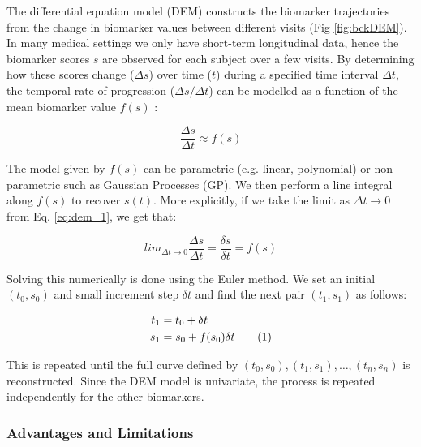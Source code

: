 The differential equation model (DEM) \cite{ashford2001modeling, yang2011quantifying, sabuncu2011dynamics, villemagne2013amyloid, oxtoby2018} constructs the biomarker trajectories from the change in biomarker values between different visits (Fig \ref{fig:bckDEM}). In many medical settings we only have short-term longitudinal data, hence the biomarker scores $s$ are observed for each subject over a few visits. By determining how these scores change ($\Delta s$) over time ($t$) during a specified time interval $\Delta t$, the temporal rate of progression ($\Delta s/\Delta t$) can be modelled as a function of the mean biomarker value $f(s)$ \cite{ashford2001modeling}:

\begin{equation}
\label{eq:dem_1}
 \frac{\Delta s}{\Delta t} \approx f(s)
\end{equation}

The model given by $f(s)$ can be parametric (e.g. linear, polynomial) or non-parametric such as Gaussian Processes (GP). We then perform a line integral along $f(s)$ to recover $s(t)$. More explicitly, if we take the limit as $\Delta t \xrightarrow{} 0$ from Eq. \ref{eq:dem_1}, we get that:

\begin{equation}
\label{eq:dem2}
lim_{\Delta t \xrightarrow{}  0} \frac{\Delta s}{\Delta t} = \frac{\delta s}{\delta t} = f(s)
\end{equation}

Solving this numerically is done using the Euler method. We set an initial $(t_0,s_0)$ and small increment step $\delta t$ and find the next pair $(t_1, s_1)$ as follows:

\newcommand\numberthis{\addtocounter{equation}{1}\tag{\theequation}}

\begin{align*}
 t_1 &= t_0 + \delta t \\
 s_1 &= s_0 + f(s_0) \delta t \numberthis \label{eq:dem3}
\end{align*}

This is repeated until the full curve defined by $(t_0, s_0), (t_1, s_1), \dots, (t_n, s_n)$ is reconstructed. Since the DEM model is univariate, the process is repeated independently for the other biomarkers. 

\subsubsection{Advantages and Limitations}

